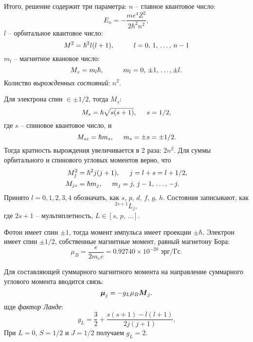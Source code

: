 
Итого, решение содержит три параметра: $n$ -- главное квантовое число:
\begin{equation*}
    E_n = - \frac{m e^4 Z^2}{2 \hbar^2 n^2},
\end{equation*}
$l$ -- орбитальное квантовое число:
\begin{equation*}
    M^2 = \hbar^2 l (l+1),\hspace{10 mm} 
    l = 0,\, 1,\, \ldots,\, n-1
\end{equation*}
$m_l$ -- магнитное квановое число:
\begin{equation*}
    M_z = m_l \hbar, \hspace{10 mm} m_l = 0,\, \pm 1,\, \ldots, \pm l.
\end{equation*}
Колиство \textit{вырожденных состояний}: $n^2$. 

Для электрона спин $\in \pm 1/2$, тогда $M_s$:
\begin{equation*}
    M_s = \hbar \sqrt{s(s+1)},
    \hspace{5 mm} 
    s = 1/2,
\end{equation*}
где $s$ -- спиновое квантовое число, и
\begin{equation*}
    M_{sz} = \hbar m_s,
    \hspace{5 mm} 
    m_s = \pm s = \pm 1/2.
\end{equation*}
Тогда кратность вырождения увеличивается в 2 раза: $2 n^2$.
Для суммы орбитального и спинового угловых моментов верно, что
\begin{align*}
    M_j^2 &= \hbar^2 j (j+1),
    \hspace{5 mm} 
    j  =l+s = l + 1/2, \\
    M_{jz} &= \hbar m_j,
    \hspace{5 mm} m_j = j,\, j-1,\, \ldots,\, -j.
\end{align*}
Принято $l=0,1,2,3,4$ обозначать, как $s,\, p,\, d,\, f,\, g,\, h$. Состояния записывают, как
\begin{equation*}
    {}^{2s+1}L_j,
\end{equation*}
где $2s + 1$ -- мультиплетность, $L \in [s,\, p,\, \ldots]$.



Фотон имеет спин $\pm 1$, тогда момент импульса имеет проекции $\pm \hbar$. Электрон имеет спин $\pm 1/2$, собственные магнитные момент, равный магнетону Бора:
\begin{equation*}
    \mu_B = \frac{e}{2 m_e c} = 0.92740 \times  10^{-20} \text{ эрг}/\text{Гс}.
\end{equation*}

Для составляющей суммарного магнитного момента на направление суммарного углового момента вводится связь:
\begin{equation*}
    \mbox{\boldmath $\mu$}_j = - g_L \mu_B \mbox{\boldmath $M$}_j.
\end{equation*}
шде \textit{фактор Ланде}:
\begin{equation*}
    g_L = \frac{3}{2} + \frac{s(s+1) - l(l+1)}{2 j(j+1)}.
\end{equation*}
При  $L=0$, $S= 1/2$ и $J=1/2$ получаем $g_L = 2$. 
